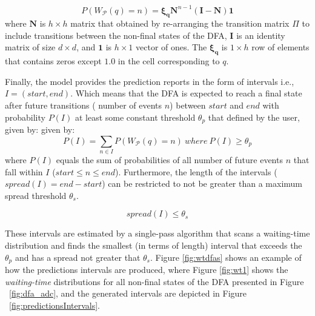 \begin{equation*}
P(W_{\mathcal{P}}(q)=n)=\boldsymbol{\xi_{q}}\boldsymbol{N}^{n-1}(\boldsymbol{I}-\boldsymbol{N})\boldsymbol{1}
\end{equation*}
where $\boldsymbol{N}$ is $h \times h$ matrix that obtained by re-arranging the transition matrix $\Pi$ to include transitions between the non-final states of the DFA, $\boldsymbol{I}$ is an identity matrix of size $d \times d$, and  $\boldsymbol{1}$ is $h \times 1$ vector of ones. The $\boldsymbol{\xi_{q}}$ is $1 \times h$ row of elements that contains zeros except $1.0$ in the cell corresponding to $q$. 
\par Finally, the model provides the prediction reports in the form of intervals i.e.,  $I=(\mathit{start},\mathit{end})$. Which means that the DFA is expected to reach a final state  after future transitions ( number of events $n$) between $\mathit{start}$ and $\mathit{end}$ with probability $P(I)$ at least some constant threshold $\theta_{p}$ that defined by the user, given by: 
 given by:
\begin{equation*}
P(I)=\sum_{n \in I}{P(W_{\mathcal{P}}(q)=n)}\ where\  P(I) \geq \theta_{p} 
\end{equation*}
where $P(I)$ equals the sum of probabilities of all number of future events $n$ that fall within $I$ ($start\leq n\leq end$). Furthermore, the length of the intervals ($spread(I) = end - start$)  can be restricted to not be greater than a maximum spread threshold $\theta_{s}$.  

\begin{equation*}
spread(I)\leq \theta_{s}
\end{equation*}

These intervals are estimated by a single-pass algorithm that scans a waiting-time distribution and finds the smallest (in terms of length) interval that exceeds the $\theta_{p}$ and has a spread  not greater that $\theta_{s}$. Figure \ref{fig:wtdfas} shows an example of how the predictions intervals are produced, where Figure \ref{fig:wt1} shows the \textit{waiting-time} distributions for all non-final states of the DFA presented in Figure ~\ref{fig:dfa_adc}, and the generated intervals are  depicted in Figure ~\ref{fig:predictionsIntervals}.




